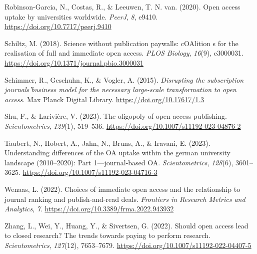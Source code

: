 \documentclass[a4paper,man,floatsintext,longtable,noextraspace,12pt]{apa6}
\newenvironment{CSLReferences}%
  {}%
  {\par}
\begin{document}
\begin{CSLReferences}{1}{0}
\leavevmode{}%
Robinson-Garcia, N., Costas, R., \& Leeuwen, T. N. van. (2020). Open
access uptake by universities worldwide. \emph{{PeerJ}}, \emph{8},
e9410. \url{https://doi.org/10.7717/peerj.9410}

\leavevmode{}%
Schiltz, M. (2018). Science without publication paywalls: cOAlition s
for the realisation of full and immediate open access. \emph{PLOS
Biology}, \emph{16}(9), e3000031.
\url{https://doi.org/10.1371/journal.pbio.3000031}

\leavevmode{}%
Schimmer, R., Geschuhn, K., \& Vogler, A. (2015). \emph{{Disrupting the
subscription journals'business model for the necessary large-scale
transformation to open access}}. Max Planck Digital Library.
\url{https://doi.org/10.17617/1.3}

\leavevmode{}%
Shu, F., \& Larivière, V. (2023). The oligopoly of open access
publishing. \emph{Scientometrics}, \emph{129}(1), 519--536.
\url{https://doi.org/10.1007/s11192-023-04876-2}

\leavevmode{}%
Taubert, N., Hobert, A., Jahn, N., Bruns, A., \& Iravani, E. (2023).
Understanding differences of the OA uptake within the german university
landscape (2010--2020): Part 1---journal-based OA.
\emph{Scientometrics}, \emph{128}(6), 3601--3625.
\url{https://doi.org/10.1007/s11192-023-04716-3}

\leavevmode{}%
Wenaas, L. (2022). Choices of immediate open access and the relationship
to journal ranking and publish-and-read deals. \emph{Frontiers in
Research Metrics and Analytics}, \emph{7}.
\url{https://doi.org/10.3389/frma.2022.943932}

\leavevmode{}%
Zhang, L., Wei, Y., Huang, Y., \& Sivertsen, G. (2022). Should open
access lead to closed research? The trends towards paying to perform
research. \emph{Scientometrics}, \emph{127}(12), 7653--7679.
\url{https://doi.org/10.1007/s11192-022-04407-5}

\end{CSLReferences}
\end{document}
